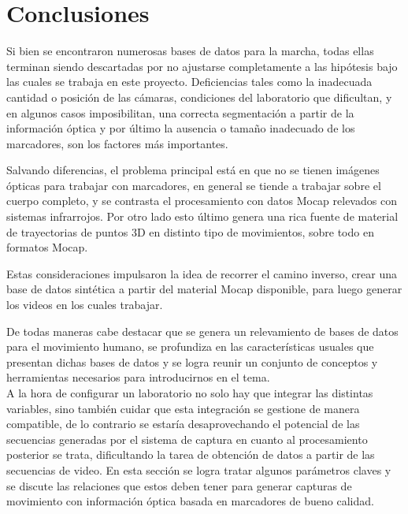  


\section{Conclusiones} 

Si bien se encontraron numerosas bases de datos para la marcha, todas ellas terminan siendo descartadas por no ajustarse completamente a las hipótesis bajo las cuales se trabaja en este proyecto. Deficiencias tales como la inadecuada cantidad o posición de las cámaras, condiciones del laboratorio que dificultan, y en algunos casos imposibilitan, una correcta segmentación a partir de la información óptica y por último la ausencia o tamaño inadecuado de los marcadores, son los factores más importantes.


Salvando diferencias, el problema principal está en que no se tienen imágenes ópticas para trabajar con marcadores, en general se tiende a trabajar sobre el cuerpo completo, y se contrasta el procesamiento con datos Mocap relevados con sistemas infrarrojos. Por otro lado esto último genera una rica fuente de material de trayectorias de puntos 3D en distinto tipo de movimientos, sobre todo en formatos Mocap.



Estas consideraciones impulsaron la idea de recorrer el camino inverso, crear una base de datos sintética a partir del material Mocap disponible, para luego generar los videos en los cuales trabajar.  


De todas maneras cabe destacar que se genera un relevamiento de bases de datos para el movimiento humano, se profundiza en las características usuales que presentan dichas bases de datos y se logra reunir un conjunto de conceptos y herramientas necesarios para introducirnos en el tema. \\



A la hora de configurar un laboratorio no solo hay que integrar las distintas variables, sino también cuidar que esta integración se gestione de manera compatible, de lo contrario se estaría desaprovechando el potencial de las secuencias generadas por el sistema de captura en cuanto al procesamiento posterior se trata, dificultando la tarea de obtención de datos a partir de las secuencias de video.
En esta sección se logra tratar algunos parámetros claves y se discute las relaciones que estos deben tener para generar capturas de movimiento con información óptica basada en marcadores de bueno calidad.


